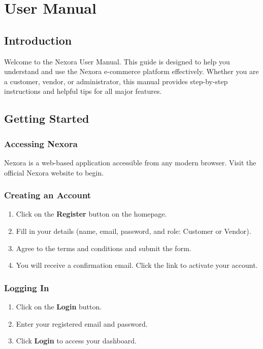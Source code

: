 
\chapter{User Manual}

\section{Introduction}
Welcome to the Nexora User Manual. This guide is designed to help you understand and use the Nexora e-commerce platform effectively. Whether you are a customer, vendor, or administrator, this manual provides step-by-step instructions and helpful tips for all major features.

\section{Getting Started}
\subsection{Accessing Nexora}
Nexora is a web-based application accessible from any modern browser. Visit the official Nexora website to begin.

\subsection{Creating an Account}
\begin{enumerate}
    \item Click on the \textbf{Register} button on the homepage.
    \item Fill in your details (name, email, password, and role: Customer or Vendor).
    \item Agree to the terms and conditions and submit the form.
    \item You will receive a confirmation email. Click the link to activate your account.
\end{enumerate}

\subsection{Logging In}
\begin{enumerate}
    \item Click on the \textbf{Login} button.
    \item Enter your registered email and password.
    \item Click \textbf{Login} to access your dashboard.
\end{enumerate}

